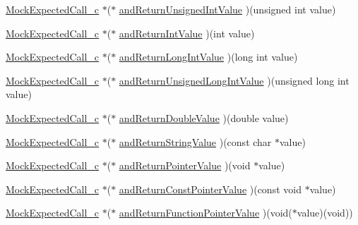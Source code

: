 \begin{DoxyCompactItemize}
\item 
\hyperlink{_mock_support__c_8h_a4a6f7402ef6c827e9fe1f32378c1536a}{Mock\+Expected\+Call\+\_\+c} $\ast$($\ast$ \hyperlink{struct_s_mock_expected_call__c_a191e66325acd3a6d6f8712f9223de74b}{and\+Return\+Unsigned\+Int\+Value} )(unsigned int value)
\item 
\hyperlink{_mock_support__c_8h_a4a6f7402ef6c827e9fe1f32378c1536a}{Mock\+Expected\+Call\+\_\+c} $\ast$($\ast$ \hyperlink{struct_s_mock_expected_call__c_a4c20de86950113e4915a22bf0db7aeb8}{and\+Return\+Int\+Value} )(int value)
\item 
\hyperlink{_mock_support__c_8h_a4a6f7402ef6c827e9fe1f32378c1536a}{Mock\+Expected\+Call\+\_\+c} $\ast$($\ast$ \hyperlink{struct_s_mock_expected_call__c_a25bae33f4a124b75456c5f609754ea51}{and\+Return\+Long\+Int\+Value} )(long int value)
\item 
\hyperlink{_mock_support__c_8h_a4a6f7402ef6c827e9fe1f32378c1536a}{Mock\+Expected\+Call\+\_\+c} $\ast$($\ast$ \hyperlink{struct_s_mock_expected_call__c_a63b7a9e5b322192fb2223ac3c431842f}{and\+Return\+Unsigned\+Long\+Int\+Value} )(unsigned long int value)
\item 
\hyperlink{_mock_support__c_8h_a4a6f7402ef6c827e9fe1f32378c1536a}{Mock\+Expected\+Call\+\_\+c} $\ast$($\ast$ \hyperlink{struct_s_mock_expected_call__c_a196e06d2d3472fc40be05701eb76d89f}{and\+Return\+Double\+Value} )(double value)
\item 
\hyperlink{_mock_support__c_8h_a4a6f7402ef6c827e9fe1f32378c1536a}{Mock\+Expected\+Call\+\_\+c} $\ast$($\ast$ \hyperlink{struct_s_mock_expected_call__c_a03cd34a3ddb8e35dcdd72a8b67fdffe8}{and\+Return\+String\+Value} )(const char $\ast$value)
\item 
\hyperlink{_mock_support__c_8h_a4a6f7402ef6c827e9fe1f32378c1536a}{Mock\+Expected\+Call\+\_\+c} $\ast$($\ast$ \hyperlink{struct_s_mock_expected_call__c_a0b465513354d63a200892acf98fe40aa}{and\+Return\+Pointer\+Value} )(void $\ast$value)
\item 
\hyperlink{_mock_support__c_8h_a4a6f7402ef6c827e9fe1f32378c1536a}{Mock\+Expected\+Call\+\_\+c} $\ast$($\ast$ \hyperlink{struct_s_mock_expected_call__c_aa53b073a2d3945812bbe340410eb3a40}{and\+Return\+Const\+Pointer\+Value} )(const void $\ast$value)
\item 
\hyperlink{_mock_support__c_8h_a4a6f7402ef6c827e9fe1f32378c1536a}{Mock\+Expected\+Call\+\_\+c} $\ast$($\ast$ \hyperlink{struct_s_mock_expected_call__c_aec92994602c7b6348285beaad764d3e8}{and\+Return\+Function\+Pointer\+Value} )(void($\ast$value)(void))
\end{DoxyCompactItemize}


